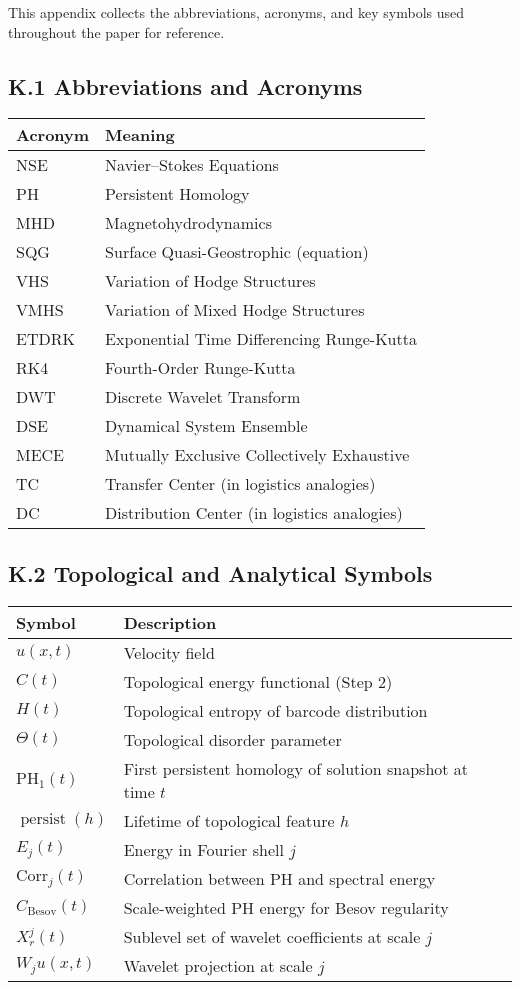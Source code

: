 \documentclass[11pt]{article}
\theoremstyle{definition}
\begin{document}
This appendix collects the abbreviations, acronyms, and key symbols used throughout the paper for reference.

\subsection*{K.1 Abbreviations and Acronyms}
\begin{tabular}{ll}
\textbf{Acronym} & \textbf{Meaning} \\
\hline
NSE & Navier--Stokes Equations \\
PH & Persistent Homology \\
MHD & Magnetohydrodynamics \\
SQG & Surface Quasi-Geostrophic (equation) \\
VHS & Variation of Hodge Structures \\
VMHS & Variation of Mixed Hodge Structures \\
ETDRK & Exponential Time Differencing Runge-Kutta \\
RK4 & Fourth-Order Runge-Kutta \\
DWT & Discrete Wavelet Transform \\
DSE & Dynamical System Ensemble \\
MECE & Mutually Exclusive Collectively Exhaustive \\
TC & Transfer Center (in logistics analogies) \\
DC & Distribution Center (in logistics analogies) \\
\end{tabular}

\subsection*{K.2 Topological and Analytical Symbols}
\begin{tabular}{ll}
\textbf{Symbol} & \textbf{Description} \\
\hline
$u(x,t)$ & Velocity field \\
$C(t)$ & Topological energy functional (Step 2) \\
$H(t)$ & Topological entropy of barcode distribution \\
$\Theta(t)$ & Topological disorder parameter \\
$\mathrm{PH}_1(t)$ & First persistent homology of solution snapshot at time $t$ \\
$\operatorname{persist}(h)$ & Lifetime of topological feature $h$ \\
$E_j(t)$ & Energy in Fourier shell $j$ \\
$\mathrm{Corr}_j(t)$ & Correlation between PH and spectral energy \\
$C_{\mathrm{Besov}}(t)$ & Scale-weighted PH energy for Besov regularity \\
$X^j_r(t)$ & Sublevel set of wavelet coefficients at scale $j$ \\
$W_j u(x,t)$ & Wavelet projection at scale $j$ \\
\end{tabular}
\end{document}
